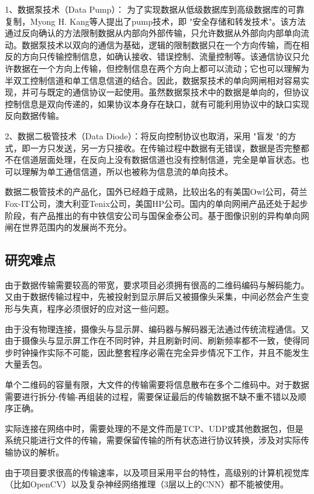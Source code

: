 1、数据泵技术（Data Pump）： 为了实现数据从低级数据库到高级数据库的可靠复制，Myong H. Kang等人提出了pump技术，即 "安全存储和转发技术"。该方法通过反向确认的方法限制数据从内部向外部传输，只允许数据从外部向内部单向流动。数据泵技术以双向的通信为基础，逻辑的限制数据只在一个方向传输，而在相反的方向只传输控制信息，如确认接收、错误控制、流量控制等\cite{杨翰文0基于}。该通信协议只允许数据在一个方向上传输，但控制信息在两个方向上都可以流动；它也可以理解为半双工控制信道和单工信息信道的结合。因此，数据泵技术的单向网闸相对容易实现，并可与既定的通信协议一起使用。虽然数据泵技术中的数据是单向的，但协议控制信息是双向传递的，如果协议本身存在缺口，就有可能利用协议中的缺口实现反向数据传输。

2、数据二极管技术（Data Diode）：将反向控制协议也取消，采用 "盲发 "的方式，即一方只发送，另一方只接收。在传输过程中数据有无错误，数据是否完整都不在信道层面处理，在反向上没有数据信道也没有控制信道，完全是单盲状态。也可以理解为单工通信信道，所以也被称为信息流的单向技术。\cite{杨翰文0基于}

数据二极管技术的产品化，国外已经趋于成熟，比较出名的有美国Owl公司，荷兰Fox-IT公司，澳大利亚Tenix公司，美国HP公司\cite{oh2015development}。国内的单向网闸产品还处于起步阶段，有产品推出的有中铁信安公司与国保金泰公司。基于图像识别的异构单向网闸在世界范围内的发展尚不充分。



\subsection{研究难点}

由于数据传输需要较高的带宽，要求项目必须拥有很高的二维码编码与解码能力。又由于数据传输过程中，先被投射到显示屏后又被摄像头采集，中间必然会产生变形与失真，程序必须很好的应对这一些问题。

由于没有物理连接，摄像头与显示屏、编码器与解码器无法通过传统流程通信。又由于摄像头与显示屏工作在不同时钟，并且刷新时间、刷新频率都不一致，使得同步时钟操作实际不可能，因此整套程序必需在完全异步情况下工作，并且不能发生大量丢包。

单个二维码的容量有限，大文件的传输需要将信息散布在多个二维码中。对于数据需要进行拆分-传输-再组装的过程，需要保证最后的传输数据不缺不重不错以及顺序正确。

实际连接在网络中时，需要处理的不是文件而是TCP、UDP或其他数据包，但是系统只能进行文件的传输，需要保留传输的所有状态进行协议转换，涉及对实际传输协议的解析。

由于项目要求很高的传输速率，以及项目采用平台的特性，高级别的计算机视觉库（比如OpenCV）以及复杂神经网络推理（3层以上的CNN）都不能被使用。

